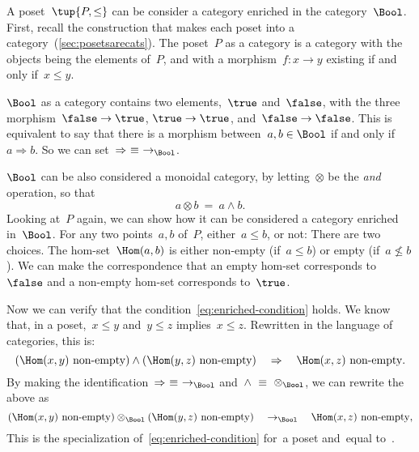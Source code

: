 \begin{example}
    A poset~$\tup{P, \leq}$ can be consider a category enriched in the
    category~$\Bool$. First, recall the construction that makes each poset into a
    category~(\cref{sec:posetsarecats}). The poset~$P$ as a category is a category with the objects being the
    elements of~$P$, and with a morphism~$f\colon x \to y$ existing if and only if~$x\leq y$.

    $\Bool$ as a category contains two elements,~$\true$ and~$\false$, with
    the three morphism~$\false \to \true$, $\true \to \true$, and~$\false \to \false$. This is equivalent to say that there is a morphism between~$a, b \in \Bool$ if and only if~$a \Rightarrow b$. So we can set~$\Rightarrow\ \equiv\ \to_{\Bool}$.

    $\Bool$ can be also considered a monoidal category, by letting~$\otimes$ be
    the \emph{and} operation, so that
    \begin{equation}
        a \otimes b\ =\ a \wedge b.
    \end{equation}
    Looking at~$P$ again, we can show how it can be considered a category enriched in~$\Bool$. For any two points~$a, b$ of~$P$, either~$a \leq b$, or not: There are two choices. The hom-set~$\Hom(a, b)$ is either non-empty
    (if~$a \leq b$) or empty (if~$a \not\leq b$). We can make the correspondence that an empty hom-set corresponds to~$\false$ and a non-empty hom-set corresponds to~$\true$.

    Now we can verify that the condition~\eqref{eq:enriched-condition} holds. We
    know that, in a poset,~$x \leq y$ and~$y \leq z$ implies~$x \leq z$.
%
    Rewritten in the language of categories, this is:
    \begin{equation}
        (\Hom(x,y)\ \text{non-empty})
        \wedge
        (\Hom(y, z)\ \text{non-empty})
        \quad
        \Rightarrow
        \quad
        \Hom(x, z)\ \text{non-empty}.
    \end{equation}
    By making the identification~$\Rightarrow\ \equiv\ \to_{\Bool}$ and~$\wedge\ \equiv\ \otimes_{\Bool}$, we can rewrite the above as
    \begin{equation}
        (\Hom(x,y)\ \text{non-empty})
        \otimes_{\Bool}
        (\Hom(y, z)\ \text{non-empty})
        \quad
        \to_{\Bool}
        \quad
        \Hom(x, z)\ \text{non-empty},
    \end{equation}
    This is the specialization of~\eqref{eq:enriched-condition}
    for~\CatC a poset and~\CatD equal to~\Bool.
\end{example}

